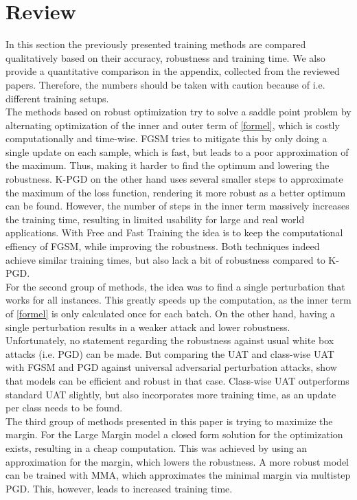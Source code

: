 \documentclass[conference]{IEEEtran}
\begin{document}
\section{Review} \label{rev}
In this section the previously presented training methods are compared qualitatively based on their accuracy, robustness and training time. We also provide a quantitative comparison in the appendix, collected from the reviewed papers. Therefore, the numbers should be taken with caution because of i.e. different training setups. \\
The methods based on robust optimization try to solve a saddle point problem by alternating optimization of the inner and outer term of \ref{formel}, which is costly computationally and time-wise. FGSM tries to mitigate this by only doing a single update on each sample, which is fast, but leads to a poor approximation of the maximum. Thus, making it harder to find the optimum and lowering the robustness. K-PGD on the other hand uses several smaller steps to approximate the maximum of the loss function, rendering it more robust as a better optimum can be found. However, the number of steps in the inner term massively increases the training time, resulting in limited usability for large and real world applications. With Free and Fast Training the idea is to keep the computational effiency of FGSM, while improving the robustness. Both techniques indeed achieve similar training times, but also lack a bit of robustness compared to K-PGD. \\
For the second group of methods, the idea was to find a single perturbation that works for all instances. This greatly speeds up the computation, as the inner term of \ref{formel} is only calculated once for each batch. On the other hand, having a single perturbation results in a weaker attack and lower robustness. Unfortunately, no statement regarding the robustness against usual white box attacks (i.e. PGD) can be made. But comparing the UAT and class-wise UAT with FGSM and PGD against universal adversarial perturbation attacks, show that models can be efficient and robust in that case. Class-wise UAT outperforms standard UAT slightly, but also incorporates more training time, as an update per class needs to be found. \\
The third group of methods presented in this paper is trying to maximize the margin. For the Large Margin model a closed form solution for the optimization exists, resulting in a cheap computation. This was achieved by using an approximation for the margin, which lowers the robustness. A more robust model can be trained with MMA, which approximates the minimal margin via multistep PGD. This, however, leads to increased training time.
\end{document}
